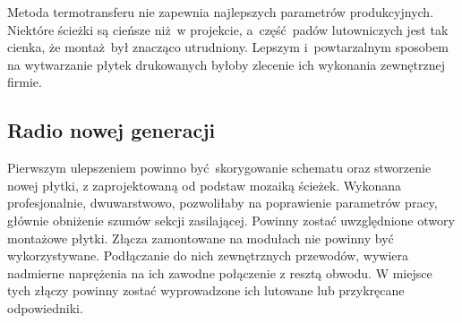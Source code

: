 \documentclass[polish]{aghengthesis}
\let\tempone\itemize
\let\temptwo\enditemize
\renewenvironment{itemize}{\tempone\setlength{\itemsep}{0cm}}{\temptwo}
\begin{document}
				
				Metoda termotransferu nie zapewnia najlepszych parametrów produkcyjnych. Niektóre ścieżki są cieńsze niż w projekcie, a~część padów lutowniczych jest tak cienka, że montaż był znacząco utrudniony. Lepszym i~powtarzalnym sposobem na wytwarzanie płytek drukowanych byłoby zlecenie ich wykonania zewnętrznej firmie.
		
		\subsection{Radio nowej generacji}
			Pierwszym ulepszeniem powinno być skorygowanie schematu oraz stworzenie nowej płytki, z zaprojektowaną od podstaw mozaiką ścieżek. Wykonana profesjonalnie, dwuwarstwowo, pozwoliłaby na poprawienie parametrów pracy, głównie obniżenie szumów sekcji zasilającej. Powinny zostać uwzględnione otwory montażowe płytki.
			Złącza zamontowane na modułach nie powinny być wykorzystywane.
			Podłączanie do nich zewnętrznych przewodów, wywiera nadmierne naprężenia na ich zawodne połączenie z resztą obwodu.
			W miejsce tych złączy powinny zostać wyprowadzone ich lutowane lub przykręcane odpowiedniki.
			$ $\\
\end{document}
